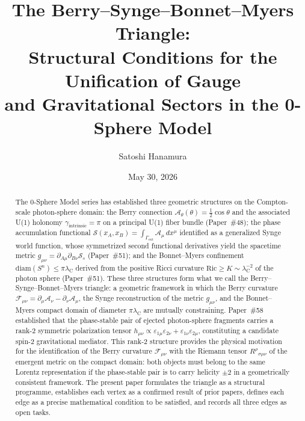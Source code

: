 \documentclass[%
 reprint, amsmath,amssymb, aps, prd, ]{revtex4-2}
\numberwithin{equation}{section}
\newcommand{\lambdaC}{\lambda_{\mathrm{C}}}
\newcommand{\BerryA}{\mathcal{A}}
\newcommand{\BerryF}{\mathcal{F}}
\newcommand{\SyngeS}{\mathcal{S}}
\begin{document}
\title{The Berry--Synge--Bonnet--Myers Triangle:\\
Structural Conditions for the Unification of Gauge\\
and Gravitational Sectors in the 0-Sphere Model}

\author{Satoshi Hanamura}
\date{May 30, 2026}

\begin{abstract}
The 0-Sphere Model series has established three geometric structures on the Compton-scale photon-sphere domain: the Berry connection $\BerryA_\theta(\theta) = \tfrac{1}{2}\cos\theta$ and the associated U(1) holonomy $\gamma_\mathrm{intrinsic} = \pi$ on a principal U(1) fiber bundle (Paper~\#48); the phase accumulation functional $\SyngeS(x_A, x_B) = \int_{\Gamma_\mathrm{ext}} \BerryA_\mu \, dx^\mu$ identified as a generalized Synge world function, whose symmetrized second functional derivatives yield the spacetime metric $g_{\mu\nu} = \partial_{A\mu}\partial_{B\nu}\SyngeS_s$ (Paper~\#51); and the Bonnet--Myers confinement $\mathrm{diam}(S^n) \leq \pi\lambdaC$ derived from the positive Ricci curvature $\mathrm{Ric} \geq K \sim \lambdaC^{-2}$ of the photon sphere (Paper~\#51).
These three structures form what we call the Berry--Synge--Bonnet--Myers triangle: a geometric framework in which the Berry curvature $\BerryF_{\mu\nu} = \partial_\mu \BerryA_\nu - \partial_\nu \BerryA_\mu$, the Synge reconstruction of the metric $g_{\mu\nu}$, and the Bonnet--Myers compact domain of diameter $\pi\lambdaC$ are mutually constraining.
Paper~\#58 established that the phase-stable pair of ejected photon-sphere fragments carries a rank-2 symmetric polarization tensor $h_{\mu\nu} \propto \varepsilon_{1\mu}\varepsilon_{2\nu} + \varepsilon_{1\nu}\varepsilon_{2\mu}$, constituting a candidate spin-2 gravitational mediator.
This rank-2 structure provides the physical motivation for the identification of the Berry curvature $\BerryF_{\mu\nu}$ with the Riemann tensor $R^\rho{}_{\sigma\mu\nu}$ of the emergent metric on the compact domain: both objects must belong to the same Lorentz representation if the phase-stable pair is to carry helicity $\pm 2$ in a geometrically consistent framework.
The present paper formulates the triangle as a structural programme, establishes each vertex as a confirmed result of prior papers, defines each edge as a precise mathematical condition to be satisfied, and records all three edges as open tasks.

\end{abstract}
\end{document}
